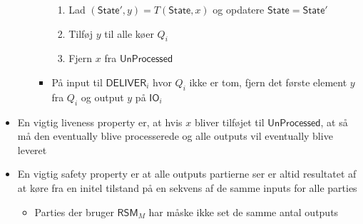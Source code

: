 \documentclass[a4, english]{article}
\begin{document}
\begin{itemize}
\begin{itemize}
\begin{itemize}
    \begin{enumerate}
			\item Lad $(\mathsf{State}', y)=T(\mathsf{State},x)$ og opdatere $\mathsf{State}= \mathsf{State}'$
			\item Tilføj $y$ til alle køer $Q_i$
			\item Fjern $x$ fra $\mathsf{UnProcessed}$
    \end{enumerate}
		\item På input til $\mathsf{DELIVER}_i$ hvor $Q_i$ ikke er tom, fjern det første element $y$ fra $Q_i$ og output $y$ på $\mathsf{IO}_i$
    \end{itemize}
  \end{itemize}
  \item En vigtig liveness property er, at hvis $x$ bliver tilføjet til $\mathsf{UnProcessed}$, at så må den eventually blive processerede og alle outputs vil eventually blive leveret
  \item En vigtig safety property er at alle outputs partierne ser er altid resultatet af at køre fra en initel tilstand på en sekvens af de samme inputs for alle parties 
  \begin{itemize}
  	\item Parties der bruger $\mathsf{RSM}_M$ har måske ikke set de samme antal outputs
  \end{itemize}
\end{itemize}
\end{document}
